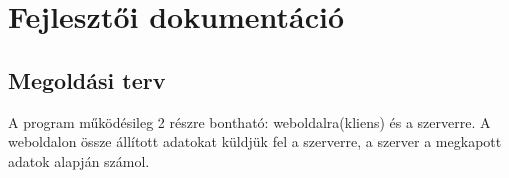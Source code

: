 \chapter{Fejlesztői dokumentáció}
\begin{comment}
A Fejlesztői dokumentáció tartalmazza
- a probléma részletes specifikációját,
- a felhasznált módszerek részletes leírását, a használt fogalmak definícióját,
- a program logikai és fizikai szerkezetének leírását (adatszerkezetek, adatbázisok,
modulfelbontás),
- a tesztelési tervet és a tesztelés eredményeit.
\end{comment}

\section{Megoldási terv}
A program működésileg 2 részre bontható: weboldalra(kliens) és a szerverre.
A weboldalon össze állított adatokat küldjük fel a szerverre, a szerver a megkapott adatok alapján számol. \newline
